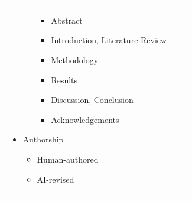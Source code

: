 \begin{longtable}[c]{ |p{8cm}|p{8cm}|p{8cm}| }
\begin{itemize}
\begin{itemize}
            \begin{itemize}
                \item Abstract
                \item Introduction, Literature Review
                \item Methodology
                \item Results
                \item Discussion, Conclusion
                \item Acknowledgements
            \end{itemize}
        \end{itemize}
        \item Authorship
        \begin{itemize}
            \item Human-authored
            \item AI-revised
        \end{itemize}
    \end{itemize}


\end{longtable}
